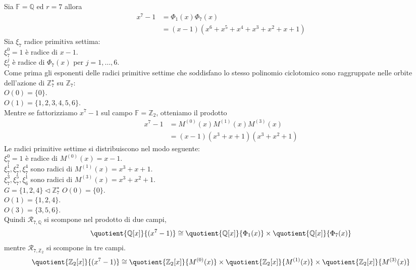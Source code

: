 Sia $\mathbb{F} = \mathbb{Q}$ ed $r = 7$ allora
\begin{align*}
  x^{7} - 1 &= \Phi_{1}(x) \Phi_{7}(x) \\
            &= (x-1)(x^6 +x^5 + x^4 + x^3 +x^2 + x +1)
\end{align*}
Sia $\xi_{7}$ radice primitiva settima:\\
$\xi_{7}^{0} = 1$ è radice di $x-1$.\\
$\xi_{7}^{j}$ è radice di $\Phi_{7}(x)$ per $j = 1, \dots ,6 $.\\
Come prima gli esponenti delle radici primitive settime che soddisfano lo
stesso polinomio ciclotomico sono raggruppate nelle orbite dell'azione di
$\mathbb{Z}_{7}^{\star}$ su $\mathbb{Z}_{7}$: \\
$O(0)= \lbrace 0 \rbrace$.\\
$O(1)= \lbrace 1,2,3,4,5,6 \rbrace$.\\
Mentre se fattorizziamo $ x^{7} - 1$ sul campo $\mathbb{F} = \mathbb{Z}_{2}$,
otteniamo il prodotto
\begin{align*}
  x^{7} - 1 &= M^{(0)}(x) M^{(1)}(x) M^{(3)}(x) \\
            &= (x-1)(x^3 + x + 1)(x^3 + x^2 + 1) 
\end{align*}
Le radici primitive settime si distribuiscono nel modo seguente: \\
$\xi_{7}^{0} = 1$ è radice di $M^{(0)}(x) = x-1$.\\
$\xi_{7}^{1}, \xi_{7}^{2}, \xi_{7}^{4}$ sono radici di $M^{(1)}(x) = x^3 + x +
1$.\\
$\xi_{7}^{3}, \xi_{7}^{5}, \xi_{6}^{1}$ sono radici di $M^{(3)}(x)= x^3 + x^2 +
1$.\\
$G = \lbrace 1,2,4 \rbrace \triangleleft \mathbb{Z}_{7}^{\star}$ 
$O(0)= \lbrace 0 \rbrace$.\\
$O(1)= \lbrace 1,2,4 \rbrace$.\\
$O(3)= \lbrace 3,5,6 \rbrace$.\\



Quindi $ \mathcal{R}_{7, \mathbb{Q}} $ si scompone nel prodotto di due
campi, 
\begin{align*}
\quotient{\mathbb{Q} \lbrack x \rbrack  }{(x^{7} - 1)}
\cong
\quotient{\mathbb{Q} \lbrack x \rbrack  }{\Phi_{1}(x)}
\times
\quotient{\mathbb{Q} \lbrack x \rbrack  }{\Phi_{7}(x)}
\end{align*}
mentre $\mathcal{R}_{7, \mathbb{Z}_{2}}$ si scompone in tre campi.
\begin{align*}
\quotient{\mathbb{Z}_{2} \lbrack x \rbrack  }{(x^{7} - 1)}
\cong
\quotient{\mathbb{Z}_{2} \lbrack x \rbrack  }{M^{(0)}(x)}
\times
\quotient{\mathbb{Z}_{2} \lbrack x \rbrack  }{M^{(1)}(x)}
\times
\quotient{\mathbb{Z}_{2} \lbrack x \rbrack  }{M^{(3)}(x)}
\end{align*}


